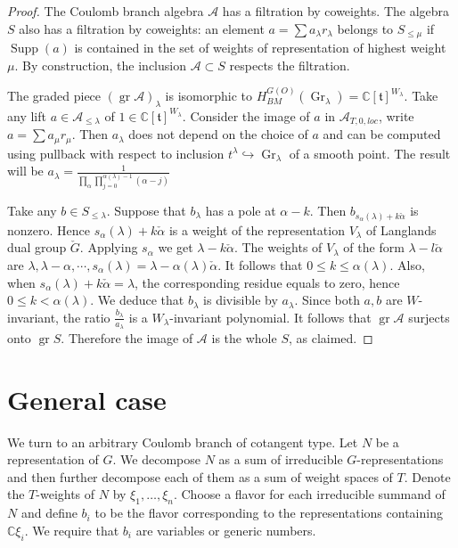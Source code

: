 \documentclass{article}
\renewcommand{\C}{\mathbb{C}}
\newcommand{\gr}{\mathop{\mathrm{gr}}\nolimits}
\newcommand{\mf}{\mathfrak}
\newcommand{\mc}[1]{\mathcal{#1}}
\newcommand{\Supp}{\operatorname{Supp}}
\newcommand{\Gr}{\operatorname{Gr}}
\begin{document}
\begin{proof}
The Coulomb branch algebra $\mc{A}$ has a filtration by coweights. The algebra $S$ also has a filtration by coweights: an element $a=\sum a_{\lambda}r_{\lambda}$ belongs to $S_{\leq \mu}$ if $\Supp(a)$ is contained in the set of weights of representation of highest weight $\mu$. By construction, the inclusion $\mc{A}\subset S$ respects the filtration.

The graded piece $(\gr\mc{A})_{\lambda}$ is isomorphic to $H_{BM}^{G(O)}(\Gr_{\lambda})=\C[\mf{t}]^{W_{\lambda}}$. Take any lift $a\in\mc{A}_{\leq \lambda}$ of $1\in\C[\mf{t}]^{W_{\lambda}}$. Consider the image of $a$ in $\mc{A}_{T,0,loc}$, write $a=\sum a_{\mu}r_{\mu}$. Then $a_{\lambda}$ does not depend on the choice of $a$ and can be computed using pullback with respect to inclusion $t^{\lambda}\hookrightarrow \Gr_{\lambda}$ of a smooth point. The result will be $a_{\lambda}=\frac{1}{\prod_{\alpha}\prod_{j=0}^{\alpha(\lambda)-1}(\alpha-j)}$

Take any $b\in S_{\leq \lambda}$. Suppose that $b_{\lambda}$ has a pole at $\alpha-k$. Then $b_{s_{\alpha}(\lambda)+k\check{\alpha}}$ is nonzero. Hence $s_{\alpha}(\lambda)+k\check{\alpha}$ is a weight of the representation $V_{\lambda}$ of Langlands dual group $\check{G}$. Applying $s_{\alpha}$ we get $\lambda-k\check{\alpha}$. The weights of $V_{\lambda}$ of the form $\lambda-l\check{\alpha}$ are $\lambda,\lambda-\alpha,\cdots, s_{\alpha}(\lambda)=\lambda-\alpha(\lambda)\check{\alpha}$. It follows that $0\leq k\leq \alpha(\lambda)$. Also, when $s_{\alpha}(\lambda)+k\check{\alpha}=\lambda$, the corresponding residue equals to zero, hence $0\leq k<\alpha(\lambda)$. We deduce that $b_{\lambda}$ is divisible by $a_{\lambda}$. Since both $a,b$ are $W$-invariant, the ratio $\frac{b_{\lambda}}{a_{\lambda}}$ is a $W_{\lambda}$-invariant polynomial. It follows that $\gr\mc{A}$ surjects onto $\gr S$. Therefore the image of $\mc{A}$ is the whole $S$, as claimed.
\end{proof}
\section{General case}


We turn to an arbitrary Coulomb branch of cotangent type. Let $N$ be a representation of $G$. We decompose $N$ as a sum of irreducible $G$-representations and then further decompose each of them as a sum of weight spaces of $T$. Denote the $T$-weights of $N$ by $\xi_1,\ldots,\xi_n$. Choose a flavor for each irreducible summand of $N$ and define $b_i$ to be the flavor corresponding to the representations containing $\C\xi_i$. We require that $b_i$ are variables or generic numbers.
\end{document}
